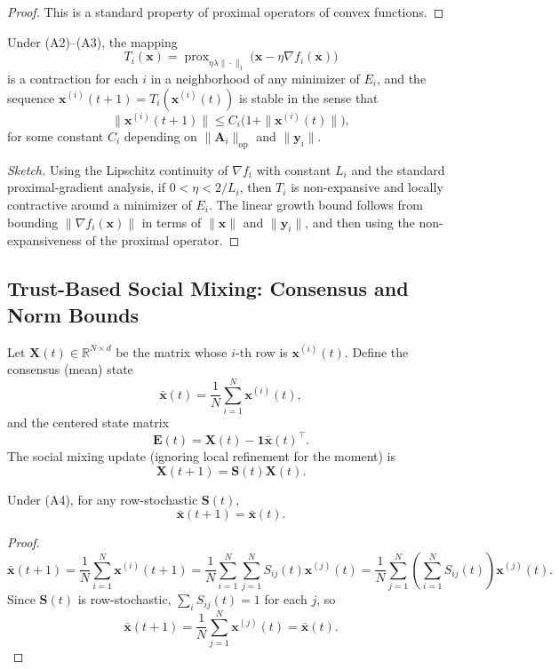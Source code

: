 \documentclass[11pt]{article}
\begin{document}
\begin{proof}
This is a standard property of proximal operators of convex functions.
\end{proof}

\begin{proposition}
Under (A2)–(A3), the mapping
\[
  T_i(\bm{x}) =
  \operatorname{prox}_{\eta \lambda \|\cdot\|_1}\!
  \bigl(
    \bm{x} - \eta \nabla f_i(\bm{x})
  \bigr)
\]
is a contraction for each $i$ in a neighborhood of any minimizer of
$E_i$, and the sequence $\bm{x}^{(i)}(t+1) = T_i(\bm{x}^{(i)}(t))$
is stable in the sense that
\[
  \|\bm{x}^{(i)}(t+1)\|
  \leq
  C_i \bigl( 1 + \|\bm{x}^{(i)}(t)\| \bigr),
\]
for some constant $C_i$ depending on $\|\bm{A}_i\|_{\mathrm{op}}$ and
$\|\bm{y}_i\|$.
\end{proposition}

\begin{proof}[Sketch]
Using the Lipschitz continuity of $\nabla f_i$ with constant $L_i$
and the standard proximal-gradient analysis, if
$0 < \eta < 2/L_i$, then $T_i$ is non-expansive and locally contractive
around a minimizer of $E_i$.
The linear growth bound follows from bounding
$\|\nabla f_i(\bm{x})\|$ in terms of $\|\bm{x}\|$ and $\|\bm{y}_i\|$,
and then using the non-expansiveness of the proximal operator.
\end{proof}

\subsection{Trust-Based Social Mixing: Consensus and Norm Bounds}

Let $\bm{X}(t) \in \mathbb{R}^{N \times d}$ be the matrix whose $i$-th
row is $\bm{x}^{(i)}(t)$.
Define the consensus (mean) state
\[
  \bar{\bm{x}}(t)
  = \frac{1}{N}\sum_{i=1}^N \bm{x}^{(i)}(t),
\]
and the centered state matrix
\[
  \bm{E}(t)
  = \bm{X}(t) - \bm{1} \bar{\bm{x}}(t)^\top.
\]
The social mixing update (ignoring local refinement for the moment) is
\[
  \bm{X}(t+1) = \bm{S}(t) \bm{X}(t).
\]

\begin{lemma}
Under (A4), for any row-stochastic $\bm{S}(t)$,
\[
  \bar{\bm{x}}(t+1) = \bar{\bm{x}}(t).
\]
\end{lemma}

\begin{proof}
\[
  \bar{\bm{x}}(t+1)
  = \frac{1}{N}\sum_{i=1}^N \bm{x}^{(i)}(t+1)
  = \frac{1}{N}\sum_{i=1}^N \sum_{j=1}^N S_{ij}(t)\bm{x}^{(j)}(t)
  = \frac{1}{N}\sum_{j=1}^N \left(
      \sum_{i=1}^N S_{ij}(t)
    \right)\bm{x}^{(j)}(t).
\]
Since $\bm{S}(t)$ is row-stochastic, $\sum_i S_{ij}(t) = 1$ for each $j$,
so
\[
  \bar{\bm{x}}(t+1)
  = \frac{1}{N}\sum_{j=1}^N \bm{x}^{(j)}(t)
  = \bar{\bm{x}}(t).
\]
\end{proof}
\end{document}
